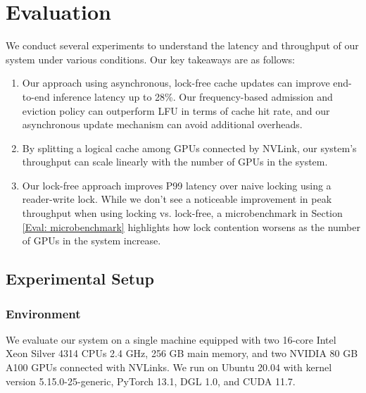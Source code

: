 \chapter{Evaluation} \label{Evaluation}
We conduct several experiments to understand the latency and throughput of our system under various conditions. Our key takeaways are as follows:

\begin{enumerate}
    \item Our approach using asynchronous, lock-free cache updates can improve end-to-end inference latency up to 28\%. Our frequency-based admission and eviction policy can outperform LFU in terms of cache hit rate, and our asynchronous update mechanism can avoid additional overheads.
    \item By splitting a logical cache among GPUs connected by NVLink, our system's throughput can scale linearly with the number of GPUs in the system.
    \item Our lock-free approach improves P99 latency over naive locking using a reader-write lock. While we don't see a noticeable improvement in peak throughput when using locking vs. lock-free, a microbenchmark in Section \ref{Eval: microbenchmark} highlights how lock contention worsens as the number of GPUs in the system increase.
\end{enumerate}

\section{Experimental Setup}
\subsection{Environment} \label{Eval: Test hardware}
We evaluate our system on a single machine equipped with two 16-core Intel Xeon Silver 4314 CPUs \@ 2.4 GHz, 256 GB main memory, and two NVIDIA 80 GB A100 GPUs connected with NVLinks. We run on Ubuntu 20.04 with kernel version 5.15.0-25-generic, PyTorch 13.1, DGL 1.0, and CUDA 11.7.

